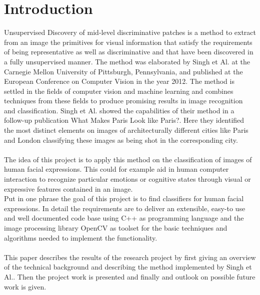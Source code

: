
\section{Introduction}\label{sec:Introduction}
Unsupervised Discovery of mid-level discriminative patches is a method to extract from an image the primitives for visual information that satisfy the requirements of being representative as well as discriminative and that have been discovered in a fully unsupervised manner. The method was elaborated by Singh et Al. at the Carnegie Mellon University of Pittsburgh, Pennsylvania, and published at the European Conference on Computer Vision in the year 2012.\cite{Singh2012DiscPat} The method is settled in the fields of computer vision and machine learning and combines techniques from these fields to produce promising results in image recognition and classification. Singh et Al. showed the capabilities of their method in a follow-up publication What Makes Paris Look like Paris?.\cite{doersch2012what} Here they identified the most distinct elements on images of architecturally different cities like Paris and London classifying these images as being shot in the corresponding city.
\\
\\
The idea of this project is to apply this method on the classification of images of human facial expressions. This could for example aid in human computer interaction to recognize particular emotions or cognitive states through visual or expressive features contained in an image.
\\
Put in one phrase the goal of this project is to find classifiers for human facial expressions.
In detail the requirements are to deliver an extensible, easy-to use and well documented code base using C++ as programming language and the image processing library OpenCV as toolset for the basic techniques and algorithms needed to implement the functionality.
\\
\\
This paper describes the results of the research project by first giving an overview of the technical background and describing the method implemented by Singh et Al.. Then the project work is presented and finally and outlook on possible future work is given.